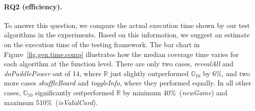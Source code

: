 \documentclass[sigconf,review,anonymous]{acmart}
\newcommand{\Random}{\mathbb{R}}
\newcommand{\RGenetic}{\mathbb{G}_{10}}
\begin{document}
\paragraph{\textbf{RQ2 (efficiency).}}
 To answer this question, we compare the actual execution time shown by our test algorithms in the experiments. Based on this information, we suggest an estimate on the execution time of the testing framework. The bar chart in Figure~\ref{fig.gen.time.comp} illustrates how the median coverage time varies for each algorithm at the function level. There are only two cases, \emph{revealAll} and \emph{doPaddlePower} out of 14, where $\Random$ just slightly outperformed $\RGenetic$ by 6\%, and two more cases \emph{shuffleBoard} and \emph{toggleInfo}, where they performed equally. In all other cases, $\RGenetic$ significantly outperformed $\Random$ by minimum 40\%~(\emph{newGame}) and maximum 510\%~(\emph{isValidCard}). 
\end{document}
